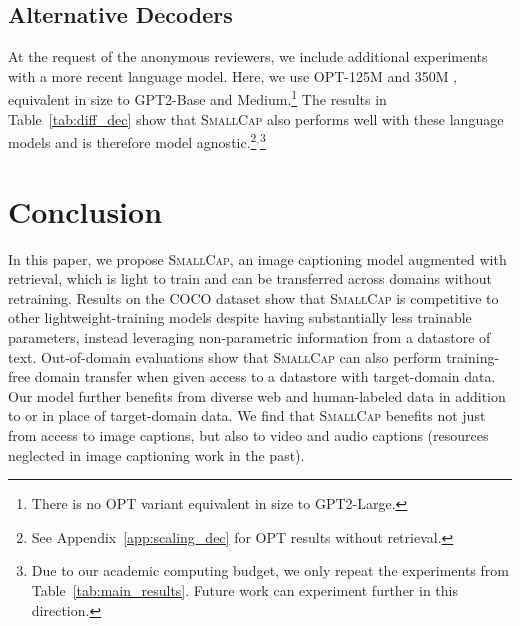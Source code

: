 \documentclass[10pt,twocolumn,letterpaper]{article}
\newcommand{\model}{\textsc{SmallCap}\xspace}
\begin{document}
\subsection{Alternative Decoders}
\label{different dec}

At the request of the anonymous reviewers, we include additional experiments with a more recent language model. Here, we use OPT-125M and 350M \cite{zhang2022opt}, equivalent in size to GPT2-Base and Medium.\footnote{There is no OPT variant equivalent in size to GPT2-Large.} The results in Table~\ref{tab:diff_dec} show that \model also performs well with these language models and is therefore model agnostic.\footnote{See Appendix~\ref{app:scaling_dec} for OPT results without retrieval.}$^{,}$\footnote{Due to our academic computing budget, we only repeat the experiments from Table~\ref{tab:main_results}. Future work can experiment further in this direction.}%


\section{Conclusion}


In this paper, we propose \model, an image captioning model augmented with retrieval, which is light to train and can be transferred across domains without retraining. %
Results on the COCO dataset show that \model is competitive to other lightweight-training models despite having substantially less trainable parameters, instead leveraging non-parametric information from a datastore of text. Out-of-domain evaluations show that \model can also perform training-free domain transfer when given access to a datastore with target-domain data. Our model further benefits from diverse web and human-labeled data in addition to or in place of target-domain data. We find that \model benefits not just from access to image captions, but also to video and audio captions (resources neglected in image captioning work in the past). 
\end{document}
